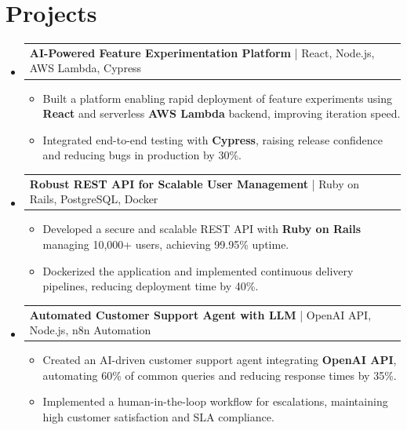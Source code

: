 \documentclass[letterpaper,11pt]{article}
\makeatletter
\newcommand{\resumeItem}[1]{
  \item\footnotesize{
    {#1 \vspace{-2pt}}
  }
}
\newcommand{\resumeProjectHeading}[2]{
    \item
    \begin{tabular*}{1.001\textwidth}{l@{\extracolsep{\fill}}r}
      \small#1 & \textbf{\small #2}\\
    \end{tabular*}\vspace{-7pt}
}
\newcommand{\resumeSubHeadingListStart}{\begin{itemize}[leftmargin=0pt, label={}]}
\newcommand{\resumeSubHeadingListEnd}{\end{itemize}}
\newcommand{\resumeItemListStart}{\begin{itemize}[leftmargin=*]}
\newcommand{\resumeItemListEnd}{\end{itemize}\vspace{-5pt}}
\makeatother
\begin{document}
\section{Projects}
    \vspace{-5pt}
    \resumeSubHeadingListStart
      \resumeProjectHeading
          {\textbf{AI-Powered Feature Experimentation Platform} | React, Node.js, AWS Lambda, Cypress}{}
          \resumeItemListStart
              \resumeItem{Built a platform enabling rapid deployment of feature experiments using \textbf{React} and serverless \textbf{AWS Lambda} backend, improving iteration speed.}
              \resumeItem{Integrated end-to-end testing with \textbf{Cypress}, raising release confidence and reducing bugs in production by 30\%.}
          \resumeItemListEnd
          \vspace{-12pt}
      \resumeProjectHeading
          {\textbf{Robust REST API for Scalable User Management} | Ruby on Rails, PostgreSQL, Docker}{}
          \resumeItemListStart
              \resumeItem{Developed a secure and scalable REST API with \textbf{Ruby on Rails} managing 10,000+ users, achieving 99.95\% uptime.}
              \resumeItem{Dockerized the application and implemented continuous delivery pipelines, reducing deployment time by 40\%.}
          \resumeItemListEnd
          \vspace{-12pt}
      \resumeProjectHeading
          {\textbf{Automated Customer Support Agent with LLM} | OpenAI API, Node.js, n8n Automation}{}
          \resumeItemListStart
              \resumeItem{Created an AI-driven customer support agent integrating \textbf{OpenAI API}, automating 60\% of common queries and reducing response times by 35\%.}
              \resumeItem{Implemented a human-in-the-loop workflow for escalations, maintaining high customer satisfaction and SLA compliance.}
          \resumeItemListEnd
    \resumeSubHeadingListEnd
\end{document}

